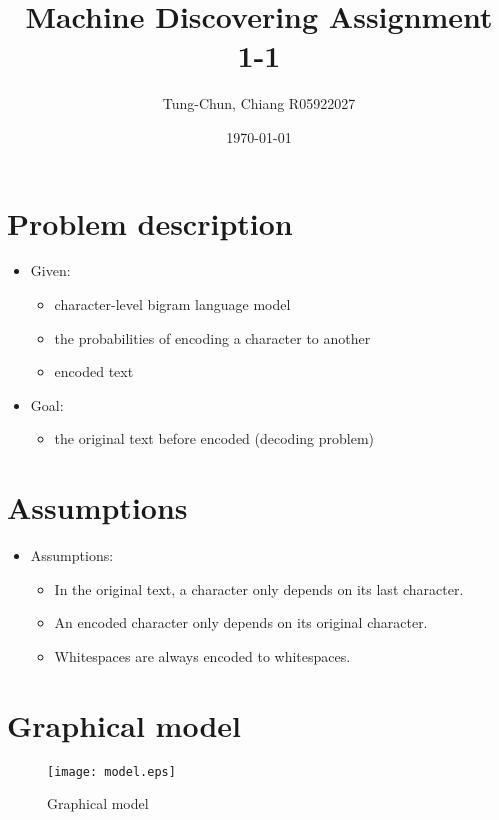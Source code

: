 \documentclass[12pt]{article}%
\begin{document}
\title{Machine Discovering Assignment 1-1}
\author{Tung-Chun, Chiang R05922027}
\date{\today}
\maketitle



 

\section{Problem description}
\begin{itemize}
	\item Given:
		\begin{itemize}
			\item character-level bigram language model
			\item the probabilities of encoding a character to another
			\item encoded text
		\end{itemize}
	\item Goal:
		\begin{itemize}
			\item the original text before encoded (decoding problem)
		\end{itemize}
\end{itemize}

\section{Assumptions}
\begin{itemize}
	\item Assumptions:
		\begin{itemize}
			\item In the original text, a character only depends on its last character.
			\item An encoded character only depends on its original character.
			\item Whitespaces are always encoded to whitespaces.
		\end{itemize}
\end{itemize}
\section{Graphical model}

\begin{figure}[!htb]
\centering
\texttt{[image: model.eps]}
\caption{Graphical model}
\label{fig:model}
\end{figure}
\end{document}
